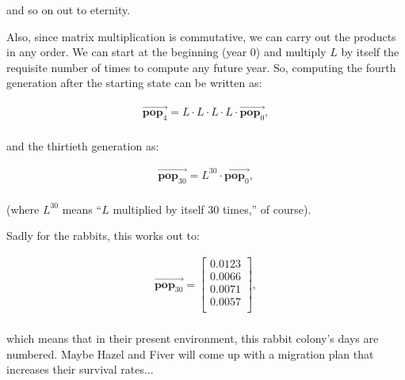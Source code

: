 \vspace{-.15in}

and so on out to eternity.

\smallskip


Also, since matrix multiplication is commutative, we can carry out the products
in any order. We can start at the beginning (year 0) and multiply $L$ by itself
the requisite number of times to compute any future year. So, computing the
fourth generation after the starting state can be written as:

\vspace{-.15in}
\begin{align*}
\overrightarrow{\textbf{pop}_4} = L \cdot L \cdot L \cdot L \cdot
\overrightarrow{\textbf{pop}_0}, \\
\end{align*}
\vspace{-.45in}

and the thirtieth generation as:

\vspace{-.15in}
\begin{align*}
\overrightarrow{\textbf{pop}_{30}} = L^{30} \cdot
\overrightarrow{\textbf{pop}_0},\\
\end{align*}
\vspace{-.45in}

(where $L^{30}$ means ``$L$ multiplied by itself 30 times,'' of course).

\bigskip

Sadly for the rabbits, this works out to:

\vspace{-.15in}
\begin{align*}
\overrightarrow{\textbf{pop}_{30}} = 
\begin{bmatrix}
0.0123 \\ 0.0066 \\ 0.0071 \\ 0.0057 \\
\end{bmatrix},\\
\end{align*}
\vspace{-.45in}


which means that in their present environment, this rabbit colony's days are
numbered. Maybe Hazel and Fiver will come up with a migration plan that
increases their survival rates...

